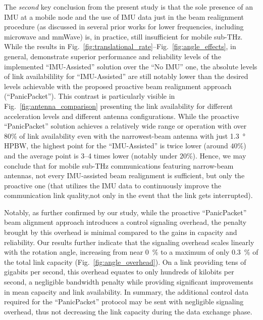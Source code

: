 \documentclass[fleqn,10pt]{wlscirep}
\begin{document}
The \emph{second} key conclusion from the present study is that the sole presence of an IMU at a mobile node and the use of IMU data just in the beam realignment procedure (as discussed in several prior works for lower frequencies, including microwave and mmWave) is, in practice, still insufficient for mobile sub-THz. While the results in Fig.~\ref{fig:translational_rate}--Fig.~\ref{fig:angle_effects}, in general, demonstrate superior performance and reliability levels of the implemented ``IMU-Assisted'' solution over the ``No IMU'' one, the absolute levels of link availabilility for ``IMU-Assisted'' are still notably lower than the desired levels achievable with the proposed proactive beam realignment approach (``PanicPacket''). This contrast is particularly visible in Fig.~\ref{fig:antenna_comparison} presenting the link availability for different acceleration levels and different antenna configurations. While the proactive ``PanicPacket'' solution achieves a relatively wide range or operation with over $80\%$ of link availability even with the narrowest-beam antenna with just \SI{1.3}{\degree} HPBW, the highest point for the ``IMU-Assisted'' is twice lower (around $40\%$) and the average point is 3--4 times lower (notably under $20\%$). Hence, we may conclude that for mobile sub-THz communications featuring narrow-beam antennas, not every IMU-assisted beam realignment is sufficient, but only the proactive one (that utilizes the IMU data to continuously improve the communication link quality,not only in the event that the link gets interrupted).

Notably, as further confirmed by our study, while the proactive ``PanicPacket'' beam alignment approach introduces a control signaling overhead, the penalty brought by this overhead is minimal compared to the gains in capacity and reliability. Our results further indicate that the signaling overhead scales linearly with the rotation angle, increasing from near \SI{0}{\percent} to a maximum of only \SI{0.3}{\percent} of the total link capacity (Fig.~\ref{fig:angle_overhead}). On a link providing tens of gigabits per second, this overhead equates to only hundreds of kilobits per second, a negligible bandwidth penalty while providing significant improvements in mean capacity and link availability. In summary, the additional control data required for the ``PanicPacket'' protocol may be sent with negligible signaling overhead, thus not decreasing the link capacity during the data exchange phase.
\end{document}
